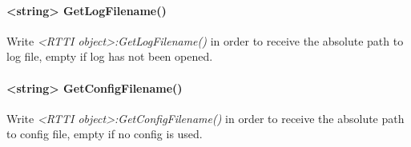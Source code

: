 \paragraph{<string> GetLogFilename()}
Write \emph{<RTTI object>:GetLogFilename()} in order to receive the absolute path to log file, empty if log has not been opened.

\paragraph{<string> GetConfigFilename()}
Write \emph{<RTTI object>:GetConfigFilename()} in order to receive the absolute path to config file, empty if no config is used.
